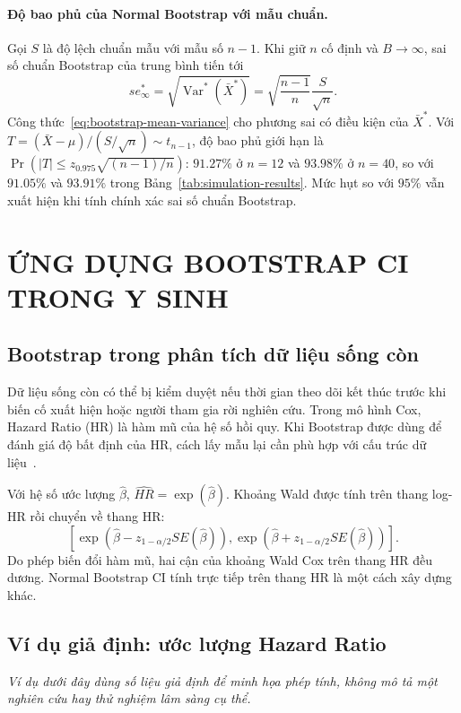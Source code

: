 \documentclass[12pt,a4paper]{article}
\theoremstyle{definition}
\numberwithin{equation}{section}
\begin{document}
\paragraph{Độ bao phủ của Normal Bootstrap với mẫu chuẩn.}
Gọi $S$ là độ lệch chuẩn mẫu với mẫu số $n-1$. Khi giữ $n$ cố định và
$B\to\infty$, sai số chuẩn Bootstrap của trung bình tiến tới
\[
    se_\infty^*=\sqrt{\operatorname{Var}^*(\bar X^*)}
    =\sqrt{\frac{n-1}{n}}\frac{S}{\sqrt n}.
\]
Công thức~\eqref{eq:bootstrap-mean-variance} cho phương sai có điều kiện của $\bar X^*$.
Với $T=(\bar X-\mu)/(S/\sqrt n)\sim t_{n-1}$, độ bao phủ giới hạn là
$\Pr(|T|\le z_{0.975}\sqrt{(n-1)/n})$: $91.27\%$ ở $n=12$ và $93.98\%$
ở $n=40$, so với $91.05\%$ và $93.91\%$ trong Bảng~\ref{tab:simulation-results}.
Mức hụt so với $95\%$ vẫn xuất hiện khi tính chính xác sai số chuẩn Bootstrap.



\newpage
\section{ỨNG DỤNG BOOTSTRAP CI TRONG Y SINH}

\subsection{Bootstrap trong phân tích dữ liệu sống còn}

Dữ liệu sống còn có thể bị kiểm duyệt nếu thời gian theo dõi kết thúc trước khi biến cố xuất hiện hoặc người tham gia rời nghiên cứu. Trong mô hình Cox, Hazard Ratio (HR) là hàm mũ của hệ số hồi quy. Khi Bootstrap được dùng để đánh giá độ bất định của HR, cách lấy mẫu lại cần phù hợp với cấu trúc dữ liệu~\cite[tr. 334--340]{davison1997}.

Với hệ số ước lượng $\widehat{\beta}$, $\widehat{HR}=\exp(\widehat{\beta})$.
Khoảng Wald được tính trên thang log-HR rồi chuyển về thang HR:
\[
\left[
\exp(\widehat{\beta}-z_{1-\alpha/2}SE(\widehat{\beta})),
\exp(\widehat{\beta}+z_{1-\alpha/2}SE(\widehat{\beta}))
\right].
\]
Do phép biến đổi hàm mũ, hai cận của khoảng Wald Cox trên thang HR đều dương.
Normal Bootstrap CI tính trực tiếp trên thang HR là một cách xây dựng khác.

\subsection{Ví dụ giả định: ước lượng Hazard Ratio}

\textit{Ví dụ dưới đây dùng số liệu giả định để minh họa phép tính, không mô tả
một nghiên cứu hay thử nghiệm lâm sàng cụ thể.}
\end{document}

